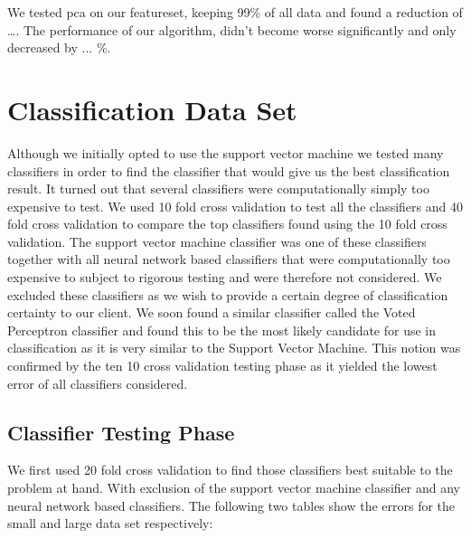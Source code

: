 \documentclass[%
        compressed,
        final,
        notitlepage,
        narroweqnarray,
        inline,
        twoside,
        ]{ieee}
\begin{document}
We tested pca on our featureset, keeping 99\% of all data and found a reduction
of …. The performance of our algorithm, didn't become worse significantly and
only decreased by ... \%.

\section{Classification Data Set}
Although we initially opted to use the support vector machine we tested many
classifiers in order to find the classifier that would give us the best
classification result. It turned out that several classifiers were
computationally  simply too expensive to test. We used 10 fold cross validation
to test all the classifiers and 40 fold cross validation to compare the top
classifiers found using the 10 fold cross validation. The support vector
machine classifier was one of these classifiers together with all neural network
based classifiers that were computationally too expensive to subject to rigorous
testing and were therefore not considered. We excluded these classifiers as we
wish to provide a certain degree of classification certainty to our client. We
soon found a similar classifier called the Voted Perceptron classifier and found
this to be the most likely candidate for use in classification as it is very
similar to the Support Vector Machine. This notion was confirmed by the ten 10 cross validation testing phase as it yielded the lowest error of all classifiers considered.

\subsection{Classifier Testing Phase}
We first used 20 fold cross validation to find those classifiers best suitable to the problem at hand. With exclusion of the support vector machine classifier and any neural network based classifiers. The following two tables show the errors for the small and large data set respectively:
\end{document}
